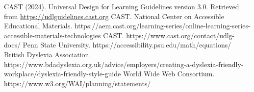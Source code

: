 \documentclass{ximera}
\begin{document}
\begin{thebibliography}{99}
    CAST (2024). Universal Design for Learning Guidelines version 3.0. Retrieved from \url{https://udlguidelines.cast.org}
    CAST. National Center on Accessible Educational Materials. https://aem.cast.org/learning-series/online-learning-series-accessible-materials-technologies
    CAST. https://www.cast.org/contact/udlg-docs/
    Penn State University. https://accessibility.psu.edu/math/equations/
    British Dyslexia Association. https://www.bdadyslexia.org.uk/advice/employers/creating-a-dyslexia-friendly-workplace/dyslexia-friendly-style-guide
    World Wide Web Consortium. https://www.w3.org/WAI/planning/statements/
\end{thebibliography}
\end{document}
